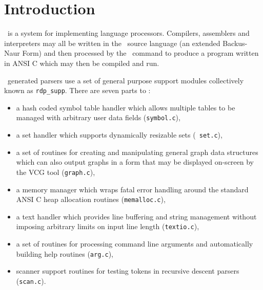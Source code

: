 \vspace*{\fill}
\begin{center}
\end{center}
\clearpage
{}
\tableofcontents
\setcounter{page}{0}
\chapter{Introduction}

\rdp\ is a system for implementing language processors. Compilers,
assemblers and interpreters may all be written in the \rdp\ source
language (an extended Backus-Naur Form) and then processed by the
\rdp\ command to produce a program written in ANSI C which may then
be compiled and run.


\rdp\ generated parsers use a set of general purpose support
modules collectively known as \verb+rdp_supp+. There are seven parts to
\rdpsupp:
\begin{itemize}
\item a hash coded symbol table handler which allows multiple tables to
be managed with arbitrary user data fields ({\tt symbol.c}),
\item a set handler which supports dynamically resizable sets ({\tt
set.c}),
\item a set of routines for creating and manipulating general graph data
structures which can also output graphs in a form that may be displayed
on-screen by the VCG tool ({\tt graph.c}),
\item a memory manager which wraps fatal error handling around the
standard ANSI C heap allocation routines ({\tt memalloc.c}),
\item a text handler which provides line buffering and string management
without imposing arbitrary limits on input line length ({\tt textio.c}),
\item a set of routines for processing command line arguments and
automatically building help routines ({\tt arg.c}),
\item scanner support routines for testing tokens in recursive descent
parsers ({\tt scan.c}).
\end{itemize}

